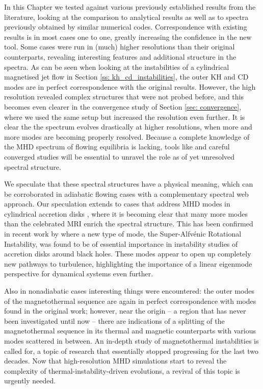 In this Chapter we tested {\legolas} against various previously established results from the literature, looking at the comparison to analytical results as well as to spectra previously obtained by similar numerical codes. Correspondence with existing results is in most cases one to one, greatly increasing the confidence in the new tool. Some cases were run in (much) higher resolutions than their original counterparts, revealing interesting features and additional structure in the spectra. As can be seen when looking at the instabilities of a cylindrical magnetised jet flow in Section \ref{ss: kh_cd_instabilities}, the outer KH and CD modes are in perfect correspondence with the original results. However, the high resolution revealed complex structures that were not probed before, and this becomes even clearer in the convergence study of Section \ref{sec: convergence}, where we used the same setup but increased the resolution even further. It is clear the the spectrum evolves drastically at higher resolutions, when more and more modes are becoming properly resolved. Because a complete knowledge of the MHD spectrum of flowing equilibria is lacking, tools like {\legolas} and careful converged studies will be essential to unravel the role as of yet unresolved spectral structure.

We speculate that these spectral structures have a physical meaning, which can be corroborated in adiabatic flowing cases with a complementary spectral web approach. Our speculation extends to cases that address MHD modes in cylindrical accretion disks \citep{keppens2002}, where it is becoming clear that many more modes than the celebrated MRI enrich the spectral structure. This has been confirmed in recent work by \citet{goedbloed2022_sari} where a new type of mode, the Super-Alfv\'enic Rotational Instability, was found to be of essential importance in instability studies of accretion disks around black holes. These modes appear to open up completely new pathways to turbulence, highlighting the importance of a linear eigenmode perspective for dynamical systems even further.

Also in nonadiabatic cases interesting things were encountered: the outer modes of the magnetothermal sequence are again in perfect correspondence with modes found in the original work; however, near the origin -- a region that has never been investigated until now -- there are indications of a splitting of the magnetothermal sequence in its thermal and magnetic counterparts with various modes scattered in between. An in-depth study of magnetothermal instabilities is called for, a topic of research that essentially stopped progressing for the last two decades. Now that high-resolution MHD simulations start to reveal the complexity of thermal-instability-driven evolutions, a revival of this topic is urgently needed.


